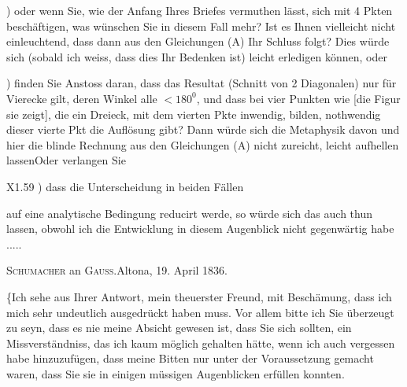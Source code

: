 ) oder wenn Sie, wie der Anfang Ihres Briefes vermuthen lässt, sich  mit 4 Pkten beschäftigen, was wünschen Sie in diesem Fall mehr? Ist es Ihnen vielleicht nicht einleuchtend, dass dann aus den Gleichungen (A) Ihr Schluss  folgt? Dies würde sich (sobald ich weiss, dass dies Ihr Bedenken ist) leicht erledigen können, oder

) finden Sie Anstoss daran, dass das Resultat (Schnitt von 2 Diagonalen) nur für Vierecke gilt, deren Winkel alle \(<180^{0}\), und dass bei vier Punkten wie [die Figur sie zeigt], die ein Dreieck, mit dem vierten Pkte inwendig, bilden, nothwendig dieser vierte Pkt die Auflösung gibt? Dann würde sich die Metaphysik davon und  hier die blinde Rechnung aus den Gleichungen (A) nicht zureicht, leicht aufhellen lassen\quad Oder verlangen Sie
\begin{center}
\end{center}
\par\vfill\noindent X1.\hfill59
\clearpage{}
) dass die Unterscheidung in beiden Fällen
\begin{center}
\hspace{1.8cm}
\end{center}
\noindent auf eine analytische Bedingung reducirt werde, so würde sich das auch thun lassen, obwohl ich die Entwicklung in diesem Augenblick nicht gegenwärtig habe .\enspace.\enspace.\enspace.\enspace.

\begin{center}\textsc{Schumacher} an \textsc{Gauss}.\quad Altona, 19. April 1836.\end{center}
\indent \{Ich sehe aus Ihrer Antwort, mein theuerster Freund, mit Beschämung, dass ich mich sehr undeutlich ausgedrückt haben muss. Vor allem bitte ich Sie überzeugt zu seyn, dass es nie meine Absicht gewesen ist, dass Sie sich  sollten, ein Missverständniss, das ich kaum möglich gehalten hätte, wenn ich auch vergessen habe hinzuzufügen, dass meine Bitten nur unter der Voraussetzung gemacht waren, dass Sie sie in einigen müssigen Augenblicken erfüllen konnten.

